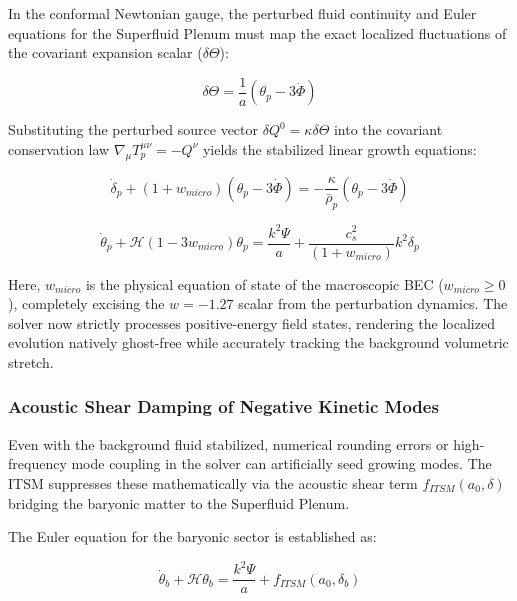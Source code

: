 \documentclass[aps,prd,10pt,twocolumn,superscriptaddress,nofootinbib,floatfix]{revtex4-2}
\begin{document}
In the conformal Newtonian gauge, the perturbed fluid continuity and Euler equations for the Superfluid Plenum must map the exact localized fluctuations of the covariant expansion scalar ($\delta\Theta$):

\begin{equation}
\delta\Theta = \frac{1}{a} \left( \theta_p - 3\dot{\Phi} \right)
\end{equation}

Substituting the perturbed source vector $\delta Q^0 = \kappa \delta\Theta$ into the covariant conservation law $\nabla_\mu T_p^{\mu\nu} = -Q^\nu$ yields the stabilized linear growth equations:

\begin{equation}
\dot{\delta}_p + (1+w_{micro}) \left( \theta_p - 3\dot{\Phi} \right) = - \frac{\kappa}{\bar{\rho}_p} (\theta_p - 3\dot{\Phi})
\end{equation}

\begin{equation}
\dot{\theta}_p + \mathcal{H}(1 - 3w_{micro})\theta_p = \frac{k^2 \Psi}{a} + \frac{c_s^2}{(1+w_{micro})} k^2 \delta_p
\end{equation}

Here, $w_{micro}$ is the physical equation of state of the macroscopic BEC ($w_{micro} \ge 0$), completely excising the $w = -1.27$ scalar from the perturbation dynamics. The solver now strictly processes positive-energy field states, rendering the localized evolution natively ghost-free while accurately tracking the background volumetric stretch.

\subsubsection{\label{sec:shear_damping}Acoustic Shear Damping of Negative Kinetic Modes}

Even with the background fluid stabilized, numerical rounding errors or high-frequency mode coupling in the solver can artificially seed growing modes. The ITSM suppresses these mathematically via the acoustic shear term $f_{ITSM}(a_0, \delta)$ bridging the baryonic matter to the Superfluid Plenum.

The Euler equation for the baryonic sector is established as:

\begin{equation}
\dot{\theta}_b + \mathcal{H}\theta_b = \frac{k^2\Psi}{a} + f_{ITSM}(a_0, \delta_b)
\end{equation}
\end{document}

